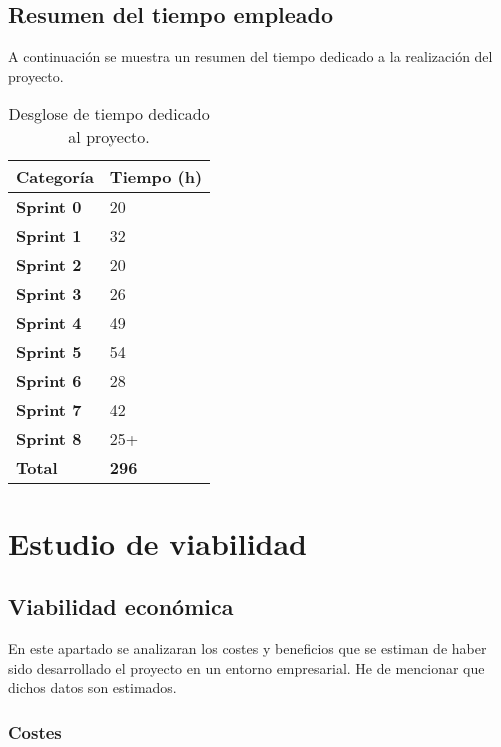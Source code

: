 \subsection{Resumen del tiempo empleado}\label{resumen-del-tiempo-empleado}

A continuación se muestra un resumen del tiempo dedicado a la realización del proyecto.

\begin{table}[h!]
    \centering
    \begin{tabular}{l l}
        \hline
        \textbf{Categoría}      & \textbf{Tiempo (h)} \\
        \hline
        \textbf{Sprint 0}       & 20    \\
        \textbf{Sprint 1}       & 32    \\
        \textbf{Sprint 2}       & 20    \\
        \textbf{Sprint 3}       & 26    \\
        \textbf{Sprint 4}       & 49    \\
        \textbf{Sprint 5}       & 54    \\
        \textbf{Sprint 6}       & 28    \\
        \textbf{Sprint 7}       & 42    \\
        \textbf{Sprint 8}       & 25+   \\ %
        \hline
        \textbf{Total}          & \textbf{296}\\
        \hline
    \end{tabular}
    \caption{Desglose de tiempo dedicado al proyecto.}\label{tabla:tiempo-dedicado-al-proyecto}
\end{table}

\section{Estudio de viabilidad}\label{estudio-de-viabilidad}

\subsection{Viabilidad económica}\label{viabilidad-economica}

En este apartado se analizaran los costes y beneficios que se estiman de haber sido desarrollado el proyecto en un entorno empresarial. He de mencionar que dichos datos son estimados.

\subsubsection{Costes}\label{costes}

